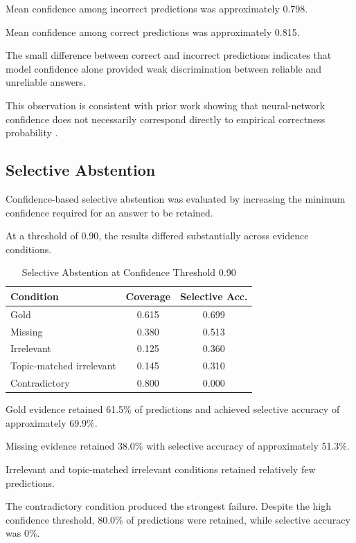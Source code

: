 \documentclass[conference]{IEEEtran}
\begin{document}
Mean confidence among incorrect predictions was approximately 0.798.

Mean confidence among correct predictions was approximately 0.815.

The small difference between correct and incorrect predictions indicates that model confidence alone provided weak discrimination between reliable and unreliable answers.

This observation is consistent with prior work showing that neural-network confidence does not necessarily correspond directly to empirical correctness probability \cite{guo2017calibration}.

\subsection{Selective Abstention}

Confidence-based selective abstention was evaluated by increasing the minimum confidence required for an answer to be retained.

At a threshold of 0.90, the results differed substantially across evidence conditions.

\begin{table}[t]
\centering
\caption{Selective Abstention at Confidence Threshold 0.90}
\label{tab:abstention}
\begin{tabular}{lcc}
\toprule
Condition & Coverage & Selective Acc. \\
\midrule
Gold & 0.615 & 0.699 \\
Missing & 0.380 & 0.513 \\
Irrelevant & 0.125 & 0.360 \\
Topic-matched irrelevant & 0.145 & 0.310 \\
Contradictory & 0.800 & 0.000 \\
\bottomrule
\end{tabular}
\end{table}

Gold evidence retained 61.5\% of predictions and achieved selective accuracy of approximately 69.9\%.

Missing evidence retained 38.0\% with selective accuracy of approximately 51.3\%.

Irrelevant and topic-matched irrelevant conditions retained relatively few predictions.

The contradictory condition produced the strongest failure. Despite the high confidence threshold, 80.0\% of predictions were retained, while selective accuracy was 0\%.
\end{document}
